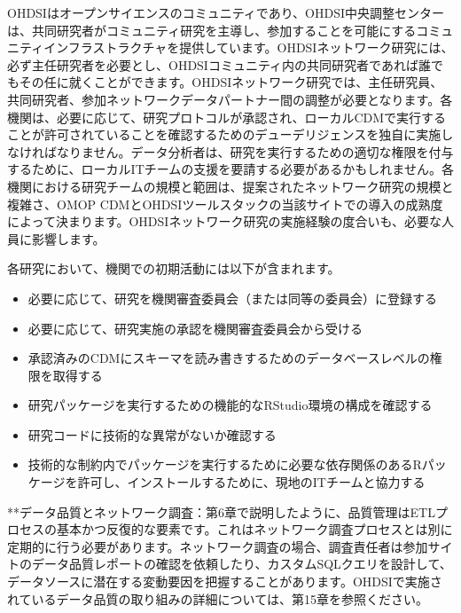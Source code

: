 \documentclass[
  11pt]{book}
\makeatletter
\newenvironment{kframe}{%
\medskip{}
\setlength{\fboxsep}{.8em}
 \def\at@end@of@kframe{}%
 \ifinner\ifhmode%
  \def\at@end@of@kframe{\end{minipage}}%
  \begin{minipage}{\columnwidth}%
 \fi\fi%
 \def\FrameCommand##1{\hskip\@totalleftmargin \hskip-\fboxsep
 \colorbox{myShadeColor}{##1}\hskip-\fboxsep
     \hskip-\linewidth \hskip-\@totalleftmargin \hskip\columnwidth}%
 \MakeFramed {\advance\hsize-\width
   \@totalleftmargin\z@ \linewidth\hsize
   \@setminipage}}%
 {\par\unskip\endMakeFramed%
 \at@end@of@kframe}
\newenvironment{rmdblock}[1]
  {
  \begin{itemize}
  \renewcommand{\labelitemi}{
    \raisebox{-.7\height}[0pt][0pt]{
      {\setkeys{Gin}{width=3em,keepaspectratio}\texttt{[image: images/\#1]}}
    }
  }
  \setlength{\fboxsep}{1em}
  \begin{kframe}
  \item
  }
  {
  \end{kframe}
  \end{itemize}
  }
\newenvironment{rmdimportant}
  {\begin{rmdblock}{important}}
  {\end{rmdblock}}
\theoremstyle{definition}
\theoremstyle{definition}
\theoremstyle{definition}
\theoremstyle{definition}
\theoremstyle{remark}
\makeatother
\begin{document}

OHDSIはオープンサイエンスのコミュニティであり、OHDSI中央調整センターは、共同研究者がコミュニティ研究を主導し、参加することを可能にするコミュニティインフラストラクチャを提供しています。OHDSIネットワーク研究には、必ず主任研究者を必要とし、OHDSIコミュニティ内の共同研究者であれば誰でもその任に就くことができます。OHDSIネットワーク研究では、主任研究員、共同研究者、参加ネットワークデータパートナー間の調整が必要となります。各機関は、必要に応じて、研究プロトコルが承認され、ローカルCDMで実行することが許可されていることを確認するためのデューデリジェンスを独自に実施しなければなりません。データ分析者は、研究を実行するための適切な権限を付与するために、ローカルITチームの支援を要請する必要があるかもしれません。各機関における研究チームの規模と範囲は、提案されたネットワーク研究の規模と複雑さ、OMOP CDMとOHDSIツールスタックの当該サイトでの導入の成熟度によって決まります。OHDSIネットワーク研究の実施経験の度合いも、必要な人員に影響します。

各研究において、機関での初期活動には以下が含まれます。

\begin{itemize}
\item
  必要に応じて、研究を機関審査委員会（または同等の委員会）に登録する
\item
  必要に応じて、研究実施の承認を機関審査委員会から受ける
\item
  承認済みのCDMにスキーマを読み書きするためのデータベースレベルの権限を取得する
\item
  研究パッケージを実行するための機能的なRStudio環境の構成を確認する
\item
  研究コードに技術的な異常がないか確認する
\item
  技術的な制約内でパッケージを実行するために必要な依存関係のあるRパッケージを許可し、インストールするために、現地のITチームと協力する
\end{itemize}

\begin{rmdimportant}
**データ品質とネットワーク調査：第6章で説明したように、品質管理はETLプロセスの基本かつ反復的な要素です。これはネットワーク調査プロセスとは別に定期的に行う必要があります。ネットワーク調査の場合、調査責任者は参加サイトのデータ品質レポートの確認を依頼したり、カスタムSQLクエリを設計して、データソースに潜在する変動要因を把握することがあります。OHDSIで実施されているデータ品質の取り組みの詳細については、第15章を参照ください。
\end{rmdimportant}
\end{document}
